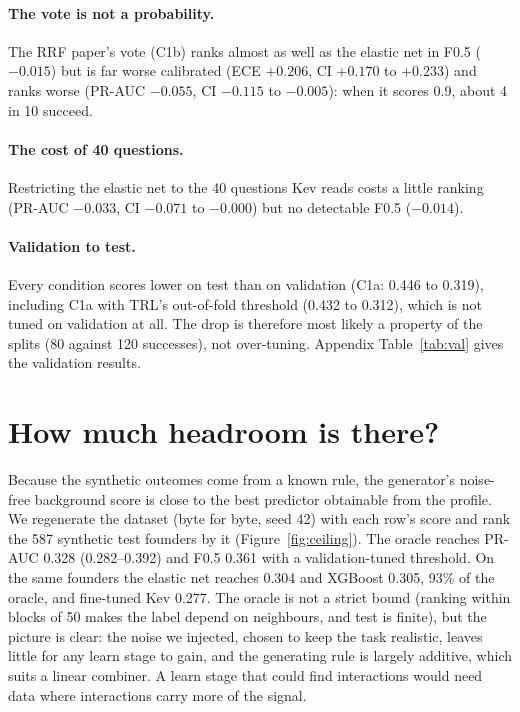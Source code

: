 \documentclass{article}
\newcommand{\cond}[1]{#1}
\begin{document}
\paragraph{The vote is not a probability.} The RRF paper's vote (\cond{C1b}) ranks almost as well
as the elastic net in F0.5 ($-0.015$) but is far worse calibrated (ECE $+0.206$, CI $+0.170$ to
$+0.233$) and ranks worse (PR-AUC $-0.055$, CI $-0.115$ to $-0.005$): when it scores 0.9, about 4
in 10 succeed.

\paragraph{The cost of 40 questions.} Restricting the elastic net to the 40 questions Kev reads
costs a little ranking (PR-AUC $-0.033$, CI $-0.071$ to $-0.000$) but no detectable F0.5
($-0.014$).

\paragraph{Validation to test.} Every condition scores lower on test than on validation
(\cond{C1a}: 0.446 to 0.319), including \cond{C1a} with TRL's out-of-fold threshold (0.432 to
0.312), which is not tuned on validation at all. The drop is therefore most likely a property of
the splits (80 against 120 successes), not over-tuning. Appendix Table~\ref{tab:val} gives the
validation results.

\section{How much headroom is there?}
\label{sec:ceiling}

Because the synthetic outcomes come from a known rule, the generator's noise-free background
score is close to the best predictor obtainable from the profile. We regenerate the dataset (byte
for byte, seed 42) with each row's score and rank the 587 synthetic test founders by it
(Figure~\ref{fig:ceiling}). The oracle reaches PR-AUC 0.328 (0.282--0.392) and F0.5 0.361 with a
validation-tuned threshold. On the same founders the elastic net reaches 0.304 and XGBoost 0.305,
93\% of the oracle, and fine-tuned Kev 0.277. The oracle is not a strict bound (ranking within
blocks of 50 makes the label depend on neighbours, and test is finite), but the picture is clear:
the noise we injected, chosen to keep the task realistic, leaves little for any learn stage to
gain, and the generating rule is largely additive, which suits a linear combiner. A learn stage
that could find interactions would need data where interactions carry more of the signal.
\end{document}
